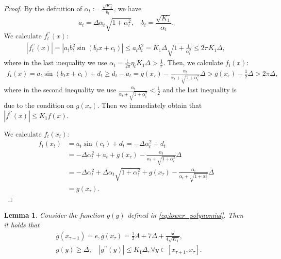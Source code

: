 \documentclass{article}
\newtheorem{lemma}{Lemma}
\newcommand{\paren}[1]{\left( #1 \right)}
\begin{document}
\begin{proof}
    By the definition of $\alpha_t:=\frac{\sqrt{K_1}}{b_t}$, we have
    $$a_t=\Delta\alpha_t\sqrt{1+\alpha_t^2},\quad b_t=\frac{\sqrt{K_1}}{\alpha_t}.$$
    We calculate $f_t^{\prime\prime}(x)$:
    \begin{align*}
        \left|f_t^{\prime\prime}(x)\right|=\left|a_tb_t^2\operatorname{sin}\paren{b_tx+c_t}\right|\leq a_tb_t^2=K_1\Delta\sqrt{1+\frac{1}{\alpha_t^2}}\leq 2\pi K_1\Delta,
    \end{align*}
    where in the last inequality we use $\alpha_t=\frac{1}{2\pi}\eta_t K_1\Delta>\frac{1}{\pi}$.
    Then, we calculate $f_t(x)$:
    \begin{align*}
        f_t(x)=a_t\operatorname{sin}\paren{b_tx+c_t}+d_t\geq d_t-a_t=g(x_\tau)-\frac{\alpha_t}{\alpha_t+\sqrt{1+\alpha_t^2}}\Delta>g(x_\tau)-\frac{1}{2}\Delta>2\pi\Delta,
    \end{align*}
    where in the second inequality we use $\frac{\alpha_t}{\alpha_t+\sqrt{1+\alpha_t^2}}<\frac{1}{2}$ and the last inequality is due to the condition on $g(x_\tau)$.
    Then we immediately obtain that $\left|f^{\prime\prime}(x)\right|\leq K_1f(x)$.

    We calculate $f_t(x_t)$:
    \begin{align*}
        f_t(x_t)&=a_t\operatorname{sin}(c_t)+d_t=-\Delta\alpha_t^2+d_t\\
        &=-\Delta\alpha_t^2+a_t+g(x_\tau)-\frac{\alpha_t}{\alpha_t+\sqrt{1+\alpha_t^2}}\Delta\\
        &=-\Delta\alpha_t^2+\Delta\alpha_t\sqrt{1+\alpha_t^2}+g(x_\tau)-\frac{\alpha_t}{\alpha_t+\sqrt{1+\alpha_t^2}}\Delta\\
        &=g(x_\tau).
    \end{align*}

\end{proof}


\begin{lemma}\label{lem:lower_property_polynomial}
    Consider the function $g(y)$ defined in \eqref{eq:lower_polynomial}. Then it holds that
    \begin{align*}
        &g(x_{\tau+1})=e, g(x_\tau)=\frac{1}{2}A+7\Delta+\frac{5\epsilon}{4\sqrt{K_1}},\\
        &g(y)\geq \Delta, \quad \left|g^{\prime\prime}(y)\right|\leq K_1\Delta, \forall y\in[x_{\tau+1},x_\tau].
    \end{align*}
\end{lemma}
\end{document}
